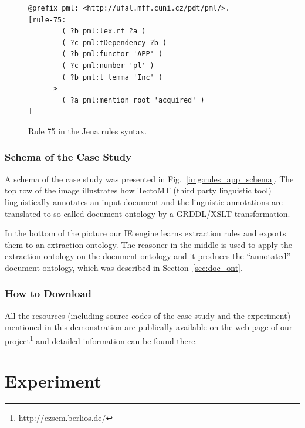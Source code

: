 \begin{figure}
\begin{verbatim}
@prefix pml: <http://ufal.mff.cuni.cz/pdt/pml/>.
[rule-75:  
        ( ?b pml:lex.rf ?a )
        ( ?c pml:tDependency ?b )
        ( ?b pml:functor 'APP' )
        ( ?c pml:number 'pl' )
        ( ?b pml:t_lemma 'Inc' )
     -> 
        ( ?a pml:mention_root 'acquired' )
]
\end{verbatim}
\caption{Rule 75 in the Jena rules syntax.}
\label{img:rules_jena}
\end{figure}


\subsubsection{Schema of the Case Study}


A schema of the case study was presented in Fig.~\ref{img:rules_app_schema}.  
The top row of the image illustrates how TectoMT (third party linguistic tool) linguistically annotates an input document and the linguistic annotations are translated to so-called document ontology by a GRDDL/XSLT transformation.

In the bottom of the picture our IE engine learns extraction rules and exports them to an extraction ontology. The reasoner in the middle is used to apply the extraction ontology on the document ontology and it produces the ``annotated'' document ontology, which was described in Section~\ref{sec:doc_ont}.




\subsubsection{How to Download}
All the resources (including source codes of the case study and the experiment) mentioned in this demonstration are publically available on the web-page of our project\footnote{\url{http://czsem.berlios.de/}} and detailed information can be found there.


\section{Experiment} \label{sec:experiment}


